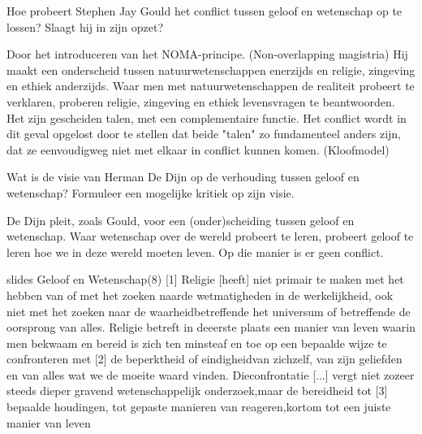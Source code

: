 \documentclass[main.tex]{subfiles}
\begin{document}
\begin{examenvraag}
    \begin{vraag}
        Hoe probeert Stephen Jay Gould het conflict tussen geloof en wetenschap op te lossen? Slaagt hij in zijn opzet?
    \end{vraag}

    \begin{antwoord}
        Door het introduceren van het NOMA-principe. (Non-overlapping magistria) 
        Hij maakt een onderscheid tussen natuurwetenschappen enerzijds en religie, zingeving en ethiek anderzijds.
        Waar men met natuurwetenschappen de realiteit probeert te verklaren, proberen religie, zingeving en ethiek 		   levensvragen te beantwoorden. 
        Het zijn gescheiden talen, met een complementaire functie.
        Het conflict wordt in dit geval opgelost door te stellen dat beide "talen" zo fundamenteel anders zijn, dat ze eenvoudigweg niet met elkaar in conflict kunnen komen. (Kloofmodel)
    \end{antwoord}
\end{examenvraag}


\begin{examenvraag}
    \begin{vraag}
        Wat is de visie van Herman De Dijn op de verhouding tussen geloof en wetenschap? Formuleer een mogelijke kritiek op zijn visie.
    \end{vraag}

    \begin{antwoord}
    	De Dijn pleit, zoals Gould, voor een (onder)scheiding tussen geloof en wetenschap. 
    	Waar wetenschap over de wereld probeert te leren, probeert geloof te leren hoe we in deze wereld moeten leven. Op die manier is er geen conflict.
    	
    		\begin{citaat}{slides Geloof en Wetenschap(8)}
    			[1] Religie [heeft] niet primair te maken met het hebben van of met het zoeken naarde wetmatigheden in de werkelijkheid, ook niet met het zoeken naar de waarheidbetreffende het universum of betreffende de oorsprong van alles. Religie betreft in deeerste plaats een manier van leven waarin men bekwaam en bereid is zich ten minsteaf en toe op een bepaalde wijze te confronteren met [2] de beperktheid of eindigheidvan zichzelf, van zijn geliefden en van alles wat we de moeite waard vinden. Dieconfrontatie [...] vergt niet zozeer steeds dieper gravend wetenschappelijk onderzoek,maar de bereidheid tot [3] bepaalde houdingen, tot gepaste manieren van reageren,kortom tot een juiste manier van leven
    		\end{citaat}
    	
    \end{antwoord}
\end{examenvraag}
\end{document}

